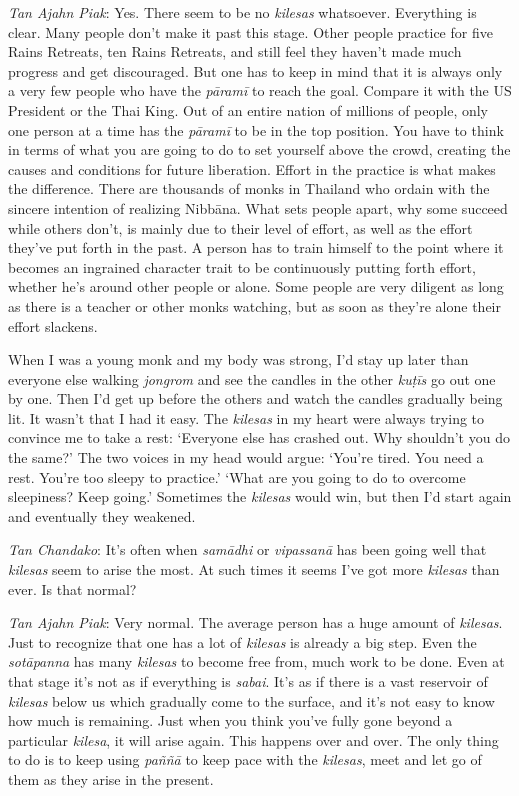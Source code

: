 \emph{Tan Ajahn Piak}: Yes. There seem to be no \emph{kilesas}
whatsoever. Everything is clear. Many people don't make it past this
stage. Other people practice for five Rains Retreats, ten Rains
Retreats, and still feel they haven't made much progress and get
discouraged. But one has to keep in mind that it is always only a very
few people who have the \emph{pāramī} to reach the goal. Compare it with
the US President or the Thai King. Out of an entire nation of millions
of people, only one person at a time has the \emph{pāramī} to be in the
top position. You have to think in terms of what you are going to do to
set yourself above the crowd, creating the causes and conditions for
future liberation. Effort in the practice is what makes the difference. 
There are thousands of monks in Thailand who ordain with the sincere
intention of realizing Nibbāna. What sets people apart, why some succeed
while others don't, is mainly due to their level of effort, as well as
the effort they've put forth in the past. A person has to train himself
to the point where it becomes an ingrained character trait to be
continuously putting forth effort, whether he's around other people or
alone. Some people are very diligent as long as there is a teacher or
other monks watching, but as soon as they're alone their effort
slackens. 

When I was a young monk and my body was strong, I'd stay up later than
everyone else walking \emph{jongrom} and see the candles in the other
\emph{kuṭīs} go out one by one. Then I'd get up before the others and
watch the candles gradually being lit. It wasn't that I had it easy. The
\emph{kilesas} in my heart were always trying to convince me to take a
rest: `Everyone else has crashed out. Why shouldn't you do the same?'
The two voices in my head would argue: `You're tired. You need a rest. 
You're too sleepy to practice.' `What are you going to do to overcome
sleepiness? Keep going.' Sometimes the \emph{kilesas} would win, but
then I'd start again and eventually they weakened. 

\emph{Tan Chandako}: It's often when \emph{samādhi} or \emph{vipassanā}
has been going well that \emph{kilesas} seem to arise the most. At such
times it seems I've got more \emph{kilesas} than ever. Is that normal? 

\emph{Tan Ajahn Piak}: Very normal. The average person has a huge amount
of \emph{kilesas}. Just to recognize that one has a lot of
\emph{kilesas} is already a big step. Even the \emph{sotāpanna} has many
\emph{kilesas} to become free from, much work to be done. Even at that
stage it's not as if everything is \emph{sabai}. It's as if there is a
vast reservoir of \emph{kilesas} below us which gradually come to the
surface, and it's not easy to know how much is remaining. Just when you
think you've fully gone beyond a particular \emph{kilesa}, it will arise
again. This happens over and over. The only thing to do is to keep using
\emph{paññā} to keep pace with the \emph{kilesas}, meet and let go of
them as they arise in the present. 

